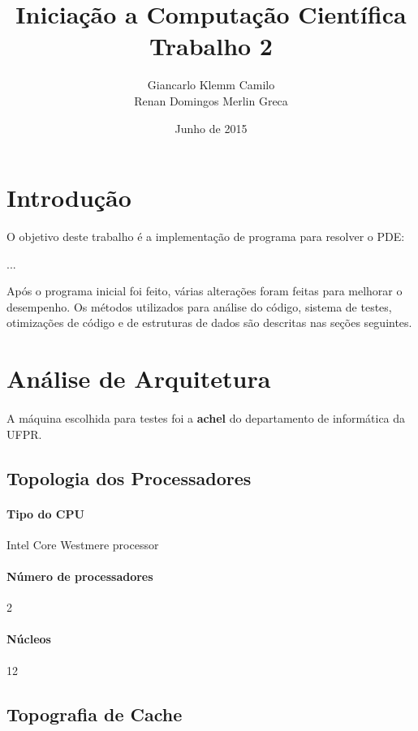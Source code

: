 \documentclass[12pt]{article}
\title{Iniciação a Computação Científica\\Trabalho 2}
\author{
	Giancarlo Klemm Camilo \\
	Renan Domingos Merlin Greca
}
\date{Junho de 2015}
\begin{document}
\maketitle
\newpage	

\tableofcontents
\newpage

\section{Introdução}
O objetivo deste trabalho é a implementação de programa para resolver o PDE:

...

Após o programa inicial foi feito, várias alterações foram feitas para melhorar o desempenho. Os métodos utilizados para análise do código, sistema de testes, otimizações de código e de estruturas de dados são descritas nas seções seguintes.

\newpage

\section{Análise de Arquitetura}
\paragraph{}
A máquina escolhida para testes foi a \textbf{achel} do departamento de informática da UFPR.

\subsection{Topologia dos Processadores}
\paragraph{Tipo do CPU} Intel Core Westmere processor
\paragraph{Número de processadores} 2
\paragraph{Núcleos} 12

\subsection{Topografia de Cache}
\end{document}
